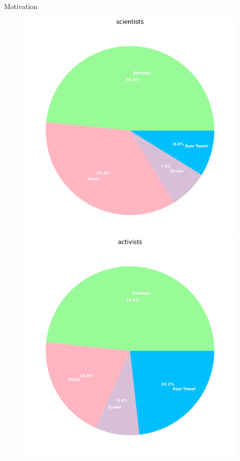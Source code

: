 \documentclass[xcolor=table,handout]{beamer}
\begin{document}
\begin{frame}{Motivation}
\begin{figure}
\centering
\begin{minipage}{.3\textwidth}
  \includegraphics[scale = 0.07]{./img/pie_tweets_scientists.jpg}
\end{minipage}%
\begin{minipage}{.3\textwidth}
  \centering
  \includegraphics[scale = 0.07]{./img/pie_tweets_activists.jpg}

\end{minipage}
\end{figure}
\end{frame}
\end{document}

